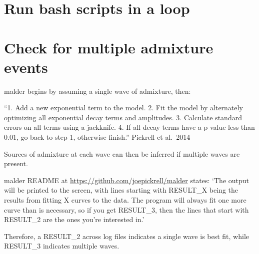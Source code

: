 \documentclass[
]{article}
\begin{document}
\section{Run bash scripts in a loop}\label{run-bash-scripts-in-a-loop}

\section{Check for multiple admixture
events}\label{check-for-multiple-admixture-events}

malder begins by assuming a single wave of admixture, then:

``1. Add a new exponential term to the model. 2. Fit the model by
alternately optimizing all exponential decay terms and amplitudes. 3.
Calculate standard errors on all terms using a jackknife. 4. If all
decay terms have a p-value less than 0.01, go back to step 1, otherwise
finish.'' Pickrell et al.~2014

Sources of admixture at each wave can then be inferred if multiple waves
are present.

malder README at \url{https://github.com/joepickrell/malder} states:
`The output will be printed to the screen, with lines starting with
RESULT\_X being the results from fitting X curves to the data. The
program will always fit one more curve than is necessary, so if you get
RESULT\_3, then the lines that start with RESULT\_2 are the ones you're
interested in.'

Therefore, a RESULT\_2 across log files indicates a single wave is best
fit, while RESULT\_3 indicates multiple waves.
\end{document}
